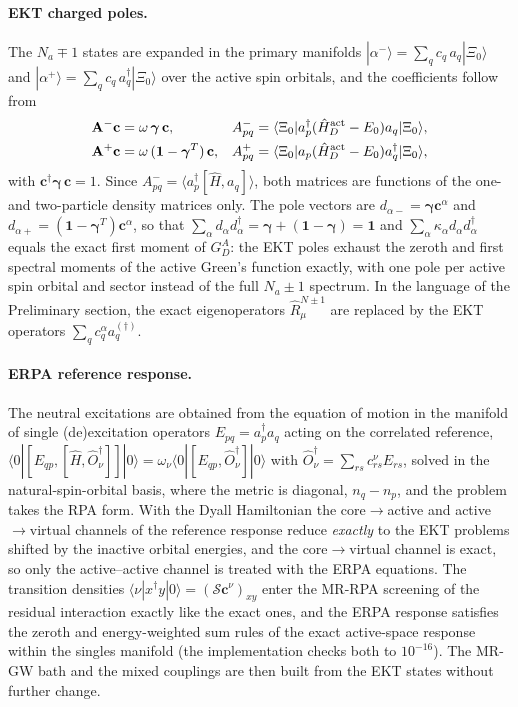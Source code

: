 \documentclass[11pt,a4paper]{article}
\newcommand{\ket}[1]{|#1\rangle}
\newcommand{\braket}[1]{\langle#1\rangle}
\newcommand{\Pre}{Preliminary section}
\begin{document}
\paragraph{EKT charged poles.}
The $N_a\mp1$ states are expanded in the primary manifolds
$\ket{\alpha^-}=\sum_q c_q\,a_q\ket{\Xi_0}$ and
$\ket{\alpha^+}=\sum_q c_q\,a_q^\dagger\ket{\Xi_0}$ over the active spin
orbitals, and the coefficients follow from
\begin{align}
  \mathbf A^{-}\mathbf c&=\omega\,\boldsymbol\gamma\,\mathbf c,&
  A^{-}_{pq}&=\braket{\Xi_0|a_p^\dagger(\hat H^{\rm act}_D-E_0)a_q|\Xi_0},
  \label{eq:ekt}\\
  \mathbf A^{+}\mathbf c&=\omega\,(\mathbf 1-\boldsymbol\gamma^{T})\,\mathbf c,&
  A^{+}_{pq}&=\braket{\Xi_0|a_p(\hat H^{\rm act}_D-E_0)a_q^\dagger|\Xi_0},
  \nonumber
\end{align}
with $\mathbf c^\dagger\boldsymbol\gamma\,\mathbf c=1$.  Since
$A^-_{pq}=\braket{a_p^\dagger[\hat H,a_q]}$, both matrices are functions of
the one- and two-particle density matrices only.  The pole vectors are
$d_{\alpha-}=\boldsymbol\gamma\mathbf c^\alpha$ and
$d_{\alpha+}=(\mathbf 1-\boldsymbol\gamma^T)\mathbf c^\alpha$, so that
$\sum_\alpha d_\alpha d_\alpha^\dagger=\boldsymbol\gamma+(\mathbf 1-\boldsymbol\gamma)=\mathbf 1$
and $\sum_\alpha\kappa_\alpha d_\alpha d_\alpha^\dagger$ equals the exact
first moment of $G^A_D$: the EKT poles exhaust the zeroth and first spectral
moments of the active Green's function exactly, with one pole per active
spin orbital and sector instead of the full $N_a\pm1$ spectrum.  In the
language of the \Pre{}, the exact eigenoperators $\hat R^{N\pm1}_\mu$ are
replaced by the EKT operators $\sum_q c^\alpha_q a_q^{(\dagger)}$.

\paragraph{ERPA reference response.}
The neutral excitations are obtained from the equation of motion in the
manifold of single (de)excitation operators $E_{pq}=a_p^\dagger a_q$ acting
on the correlated reference,
$\braket{0|[E_{qp},[\hat H,\hat O_\nu^\dagger]]|0}=\omega_\nu\braket{0|[E_{qp},\hat O_\nu^\dagger]|0}$
with $\hat O_\nu^\dagger=\sum_{rs}c^\nu_{rs}E_{rs}$, solved in the
natural-spin-orbital basis, where the metric is diagonal, $n_q-n_p$, and the
problem takes the RPA form.  With the Dyall Hamiltonian the
core$\to$active and active$\to$virtual channels of the reference response
reduce \emph{exactly} to the EKT problems shifted by the inactive orbital
energies, and the core$\to$virtual channel is exact, so only the
active--active channel is treated with the ERPA equations.  The transition
densities $\braket{\nu|x^\dagger y|0}=(\mathcal S\mathbf c^\nu)_{xy}$ enter
the MR-RPA screening of the residual interaction exactly like the exact
ones, and the ERPA response satisfies the zeroth and energy-weighted sum
rules of the exact active-space response within the singles manifold (the
implementation checks both to $10^{-16}$).  The MR-GW bath and the mixed
couplings are then built from the EKT states without further change.
\end{document}
